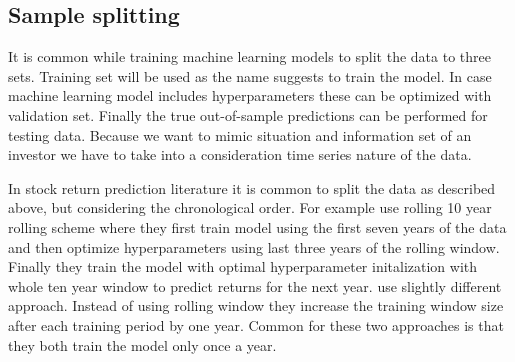 \documentclass[12pt]{article}
\begin{document}
\subsection{Sample splitting} \label{SampleSplitting}

It is common while training machine learning models to split the data to three sets. Training set will be used as the name suggests to train the model. In case machine learning model includes hyperparameters these can be optimized with validation set. Finally the true out-of-sample predictions can be performed for testing data. Because we want to mimic situation and information set of an investor we have to take into a consideration time series nature of the data. \par

In stock return prediction literature it is common to split the data as described above, but considering the chronological order. For example \citet{Fieberg} use rolling 10 year rolling scheme where they first train model using the first seven years of the data and then optimize hyperparameters using last three years of the rolling window. Finally they train the model with optimal hyperparameter initalization with whole ten year window to predict returns for the next year. \citet{guetal} use slightly different approach. Instead of using rolling window they increase the training window size after each training period by one year. Common for these two approaches is that they both train the model only once a year. \par
\end{document}
